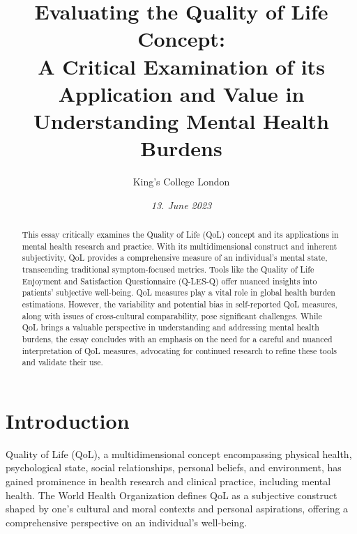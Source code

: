 \documentclass[10pt]{article}
\title{\textbf{Evaluating the Quality of Life Concept:} \\ A Critical Examination of its Application and Value in Understanding Mental Health Burdens}
\author[ ]{King’s College London}
\date{\textit{13. June 2023}}
\begin{document}

\maketitle
\thispagestyle{empty}

\begin{sloppypar} %
  \begin{abstract}
    This essay critically examines the Quality of Life (QoL) concept and its applications in mental health research and practice. With its multidimensional construct and inherent subjectivity, QoL provides a comprehensive measure of an individual's mental state, transcending traditional symptom-focused metrics. Tools like the Quality of Life Enjoyment and Satisfaction Questionnaire (Q-LES-Q) offer nuanced insights into patients' subjective well-being. QoL measures play a vital role in global health burden estimations. However, the variability and potential bias in self-reported QoL measures, along with issues of cross-cultural comparability, pose significant challenges. While QoL brings a valuable perspective in understanding and addressing mental health burdens, the essay concludes with an emphasis on the need for a careful and nuanced interpretation of QoL measures, advocating for continued research to refine these tools and validate their use.
  \end{abstract}
  \pagebreak

  \tableofcontents
  \pagebreak

  \listoffigures
  \pagebreak

  \listoftables
  \pagebreak


  \doublespacing

  \section{Introduction} \label{sec:introduction}
  Quality of Life (QoL), a multidimensional concept encompassing physical health, psychological state, social relationships, personal beliefs, and environment, has gained prominence in health research and clinical practice, including mental health. The World Health Organization defines QoL as a subjective construct shaped by one's cultural and moral contexts and personal aspirations, offering a comprehensive perspective on an individual's well-being.


\end{sloppypar}
\end{document}
